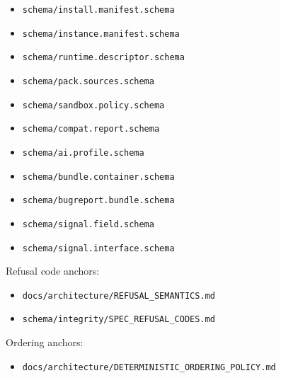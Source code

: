\documentclass[9pt,a4paper,openany]{book}
\begin{document}
\begin{itemize}
\item \texttt{schema/\allowbreak{}install.\allowbreak{}manifest.\allowbreak{}schema}
\item \texttt{schema/\allowbreak{}instance.\allowbreak{}manifest.\allowbreak{}schema}
\item \texttt{schema/\allowbreak{}runtime.\allowbreak{}descriptor.\allowbreak{}schema}
\item \texttt{schema/\allowbreak{}pack.\allowbreak{}sources.\allowbreak{}schema}
\item \texttt{schema/\allowbreak{}sandbox.\allowbreak{}policy.\allowbreak{}schema}
\item \texttt{schema/\allowbreak{}compat.\allowbreak{}report.\allowbreak{}schema}
\item \texttt{schema/\allowbreak{}ai.\allowbreak{}profile.\allowbreak{}schema}
\item \texttt{schema/\allowbreak{}bundle.\allowbreak{}container.\allowbreak{}schema}
\item \texttt{schema/\allowbreak{}bugreport.\allowbreak{}bundle.\allowbreak{}schema}
\item \texttt{schema/\allowbreak{}signal.\allowbreak{}field.\allowbreak{}schema}
\item \texttt{schema/\allowbreak{}signal.\allowbreak{}interface.\allowbreak{}schema}
\end{itemize}
Refusal code anchors:



\begin{itemize}
\item \texttt{docs/\allowbreak{}architecture/\allowbreak{}REFUSAL\_\allowbreak{}SEMANTICS.\allowbreak{}md}
\end{itemize}


\begin{itemize}
\item \texttt{schema/\allowbreak{}integrity/\allowbreak{}SPEC\_\allowbreak{}REFUSAL\_\allowbreak{}CODES.\allowbreak{}md}
\end{itemize}





Ordering anchors:



\begin{itemize}
\item \texttt{docs/\allowbreak{}architecture/\allowbreak{}DETERMINISTIC\_\allowbreak{}ORDERING\_\allowbreak{}POLICY.\allowbreak{}md}
\end{itemize}
\end{document}
